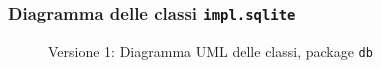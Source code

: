 \subsubsection{Diagramma delle classi \texttt{impl.sqlite}}
\vspace{0.5cm}
\begin{figure}[H]
    \centering
    \caption{Versione 1: Diagramma UML delle classi, package \texttt{db}}
    \label{fig:class_db_v_1}
\end{figure}